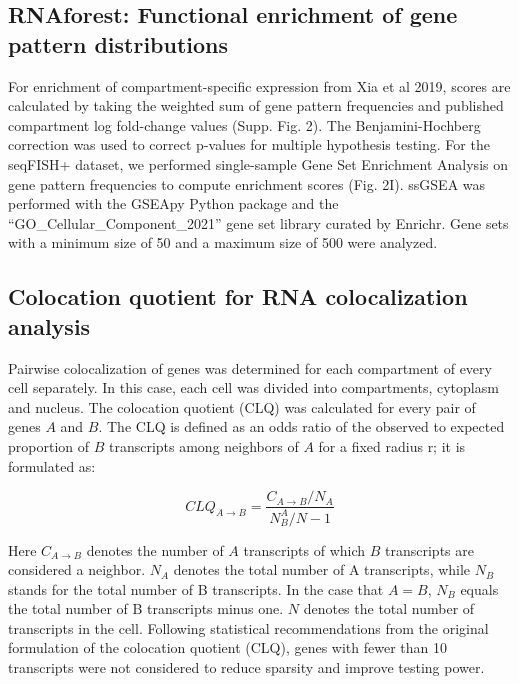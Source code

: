 \subsection{RNAforest: Functional enrichment of gene pattern distributions}
For enrichment of compartment-specific expression from Xia et al 2019\cite{xiaSpatialTranscriptomeProfiling2019}, scores are calculated by taking the weighted sum of gene pattern frequencies and published compartment log fold-change values (Supp. Fig. 2). The Benjamini-Hochberg correction was used to correct p-values for multiple hypothesis testing. For the seqFISH+ dataset, we performed single-sample Gene Set Enrichment Analysis\cite{subramanianGeneSetEnrichment2005,barbieSystematicRNAInterference2009} on gene pattern frequencies to compute enrichment scores (Fig. 2I). ssGSEA was performed with the GSEApy Python package and the ``GO\_Cellular\_Component\_2021'' gene set library curated by Enrichr\cite{xieGeneSetKnowledge2021}. Gene sets with a minimum size of 50 and a maximum size of 500 were analyzed. 

\subsection{Colocation quotient for RNA colocalization analysis}
Pairwise colocalization of genes was determined for each compartment of every cell separately. In this case, each cell was divided into compartments, cytoplasm and nucleus. The colocation quotient (CLQ) was calculated for every pair of genes \(A\) and \(B\). The CLQ is defined as an odds ratio of the observed to expected proportion of \(B\) transcripts among neighbors of \(A\) for a fixed radius r; it is formulated as:

\[CLQ_{A \rightarrow B} = \frac{C_{A \rightarrow B} / N_A}{N^{A}_{B} / N-1}\]

Here \(C_{A \rightarrow B}\) denotes the number of \(A\) transcripts of which \(B\) transcripts are considered a neighbor. \(N_A\) denotes the total number of A transcripts, while \(N_B\) stands for the total number of B transcripts. In the case that \(A=B\), \(N_B\) equals the total number of B transcripts minus one. \(N\) denotes the total number of transcripts in the cell. Following statistical recommendations from the original formulation of the colocation quotient (CLQ), genes with fewer than 10 transcripts were not considered to reduce sparsity and improve testing power\cite{leslieColocationQuotientNew2011}.

